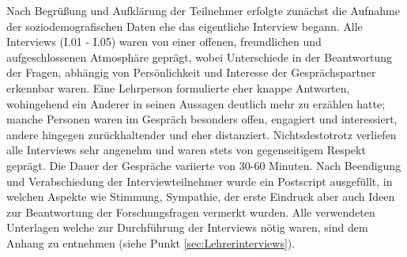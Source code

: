 Nach Begrüßung und Aufklärung der Teilnehmer erfolgte zunächst die Aufnahme der soziodemografischen Daten ehe das eigentliche Interview begann. Alle Interviews (I.01 - I.05) waren von einer offenen, freundlichen und aufgeschlossenen Atmosphäre geprägt, wobei Unterschiede in der Beantwortung der Fragen, abhängig von Persönlichkeit und Interesse der Gesprächspartner erkennbar waren. Eine Lehrperson formulierte eher knappe Antworten, wohingehend ein Anderer in seinen Aussagen deutlich mehr zu erzählen hatte; manche Personen waren im Gespräch besonders offen, engagiert und interessiert, andere hingegen zurückhaltender und eher distanziert. Nichtsdestotrotz verliefen alle Interviews sehr angenehm und waren stets von gegenseitigem Respekt geprägt. Die Dauer der Gespräche variierte von 30-60 Minuten. Nach Beendigung und Verabschiedung der Interviewteilnehmer wurde ein Postscript ausgefüllt, in welchen Aspekte wie Stimmung, Sympathie, der erste Eindruck aber auch Ideen zur Beantwortung der Forschungsfragen vermerkt wurden. Alle verwendeten Unterlagen welche zur Durchführung der Interviews nötig waren, sind dem Anhang zu entnehmen (siehe Punkt \ref{sec:Lehrerinterviews}).